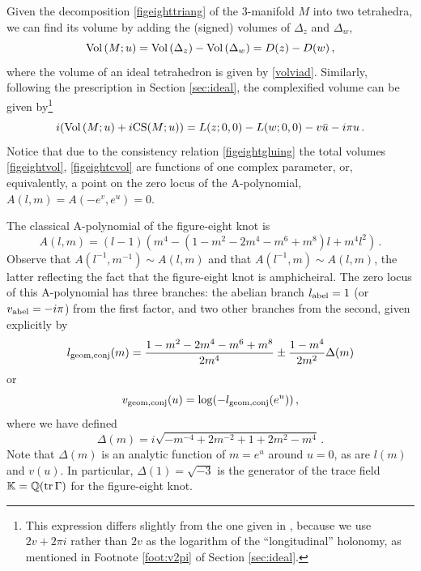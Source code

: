 \documentclass[hyper]{JHEP3}
\def\tr{{\rm tr\,}}
\newcommand\be{\begin{equation}}
\newcommand\ee{\end{equation}}
\newcommand{\Vol}{{\mbox{Vol\,}}}
\begin{document}
Given the decomposition \eqref{figeighttriang} of the 3-manifold $M$ into
two tetrahedra, we can find its volume by adding the (signed) volumes of $\Delta_z$ and $\Delta_w$,
\be
\Vol (M;u) = \Vol (\Delta_z) - \Vol (\Delta_w) = D(z)-D(w)\,,\label{figeightvol}
\ee
where the volume of an ideal tetrahedron is given by \eqref{volviad}. Similarly, following the prescription in Section \ref{sec:ideal}, the complexified volume can be given by\footnote{This expression differs slightly from the one given in \cite{neumann-2004}, because we use $2v+2\pi i$ rather than $2v$ as the logarithm of the ``longitudinal'' holonomy, as mentioned in Footnote \ref{foot:v2pi} of Section \ref{sec:ideal}.}
%
\be
i(\Vol(M;u)+i{\rm CS}(M;u)) = L(z;0,0)-L(w;0,0)-v\bar{u}-i\pi u\,. \label{figeightcvol}
\ee
%
Notice that due to the consistency relation \eqref{figeightgluing}
the total volumes \eqref{figeightvol}, \eqref{figeightcvol} are functions of one complex parameter, or,
equivalently, a point on the zero locus of the A-polynomial, $A(l,m)=A(-e^v,e^u)=0$.

The classical A-polynomial of the figure-eight knot is
\be
A(l,m) = (l-1)(m^4 - (1-m^2-2m^4-m^6+m^8)l+m^4l^2)\,.
\ee
Observe that $A(l^{-1},m^{-1})\sim A(l,m)$ and that $A(l^{-1},m) \sim A(l,m)$,
the latter reflecting the fact that the figure-eight knot is amphicheiral.
The zero locus of this A-polynomial has three branches: the abelian branch
$l_{{\rm abel}} = 1$ (or $v_{{\rm abel}} = -i\pi$) from the first factor,
and two other branches from the second, given explicitly by
\be
l_{{\rm geom,conj}} (m) = \frac{1-m^{2}-2m^4-m^6+m^8}{2m^4}\pm \frac{1-m^4}{2m^2}\Delta(m)
\ee
or
\be
v_{{\rm geom,conj}} (u) = \log(-l_{{\rm geom,conj}}(e^u))\,,
\label{v41}
\ee
where we have defined
\be
\Delta(m) = i\sqrt{-m^{-4}+2m^{-2}+1+2m^2-m^4}\,.
\label{def_Delta}
\ee
Note that $\Delta (m)$ is an analytic function of $m=e^u$ around $u=0$,
as are $l(m)$ and $v(u)$. In particular, $\Delta(1)=\sqrt{-3}$ is the generator of the trace field $\mathbb{K}=\mathbb{Q}(\tr\Gamma)$ for the figure-eight knot. 
\end{document}
